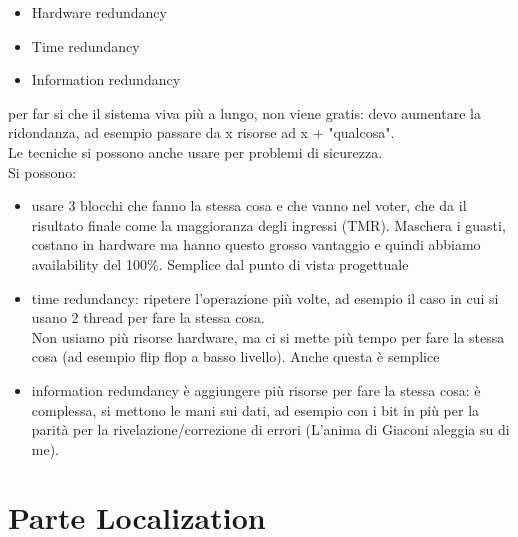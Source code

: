 \documentclass[oneside, 12pt]{extbook}
\begin{document}
\begin{itemize}
	\item Hardware redundancy
	\item Time redundancy
	\item Information redundancy
\end{itemize}
per far si che il sistema viva più a lungo, non viene gratis: devo aumentare la ridondanza, ad esempio passare da x risorse ad x + "qualcosa".\\Le tecniche si possono anche usare per problemi di sicurezza.\\
Si possono:
\begin{itemize}
	\item usare 3 blocchi che fanno la stessa cosa e che vanno nel voter, che da il risultato finale come la maggioranza degli ingressi (TMR). Maschera i guasti, costano in hardware ma hanno questo grosso vantaggio e quindi abbiamo availability del 100\%. Semplice dal punto di vista progettuale
	\item time redundancy: ripetere l'operazione più volte, ad esempio il caso in cui si usano 2 thread per fare la stessa cosa.\\Non usiamo più risorse hardware, ma ci si mette più tempo per fare la stessa cosa (ad esempio flip flop a basso livello). Anche questa è semplice
	\item information redundancy è aggiungere più risorse per fare la stessa cosa: è complessa, si mettono le mani sui dati, ad esempio con i bit in più per la parità per la rivelazione/correzione di errori (L'anima di Giaconi aleggia su di me).
\end{itemize}




\part{Parte Localization}
\end{document}
